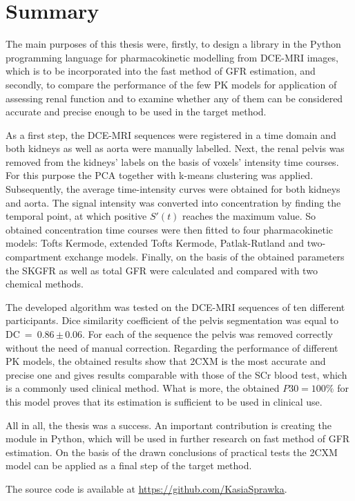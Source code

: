 \chapter{Summary}


The main purposes of this thesis were, firstly, to design a library in the Python programming language for pharmacokinetic modelling from DCE-MRI images, which is to be incorporated into the fast method of GFR estimation, and secondly, to compare the performance of the few PK models for application of assessing renal function and to examine whether any of them can be considered accurate and precise enough to be used in the target method.

As a first step, the DCE-MRI sequences were registered in a time domain and both kidneys as well as aorta were manually labelled. Next, the renal pelvis was removed from the kidneys' labels on the basis of voxels' intensity time courses. For this purpose the PCA together with k-means clustering was applied. Subsequently, the average time-intensity curves were obtained for both kidneys and aorta. The signal intensity was converted into concentration by finding the temporal point, at which positive $S'(t)$ reaches the maximum value. So obtained concentration time courses were then fitted to four pharmacokinetic models: Tofts Kermode, extended Tofts Kermode, Patlak-Rutland  and two-compartment exchange models. Finally, on the basis of the obtained parameters the SKGFR as well as total GFR were calculated and compared with two chemical methods. 
  
The developed algorithm was tested on the DCE-MRI sequences of ten different participants. Dice similarity coefficient of the pelvis segmentation was equal to DC~=~0.86\,$\pm$\,0.06. For each of the sequence the pelvis was removed correctly without the need of manual correction. Regarding the performance of different PK models, the obtained results show that 2CXM is the most accurate and precise one and gives results comparable with those of the SCr blood test, which is a commonly used clinical method. What is more, the obtained $P30 = 100\%$ for this model proves that its estimation is sufficient to be used in clinical use.   

All in all, the thesis was a success. An important contribution is creating the module in Python, which will be used in further research on fast method of GFR estimation.  
On the basis of the drawn conclusions of practical tests the 2CXM model can be applied as a final step of the target method.

The source code is available at \underline{\url{https://github.com/KasiaSprawka}}.